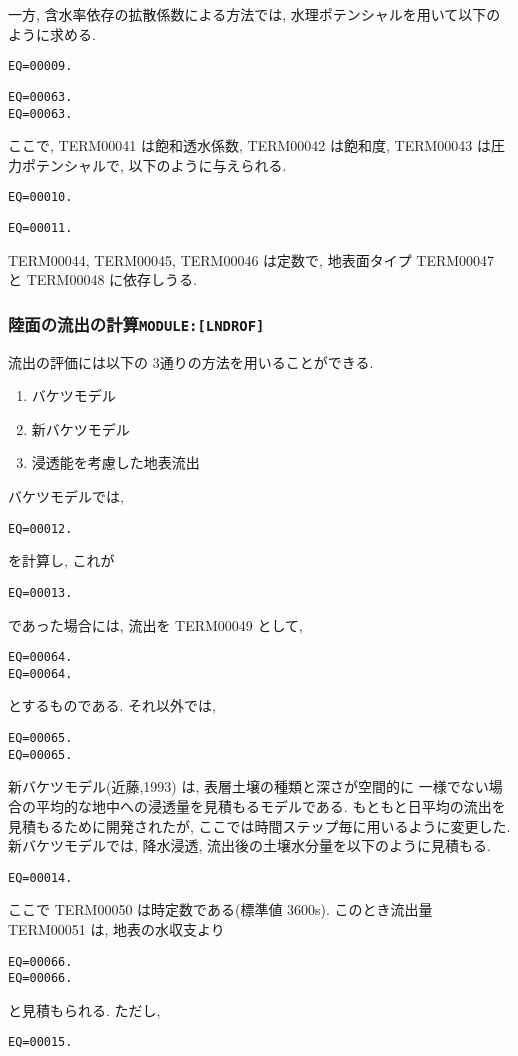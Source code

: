 一方, 含水率依存の拡散係数による方法では, 
水理ポテンシャルを用いて以下のように求める.
\begin{verbatim}
EQ=00009.
\end{verbatim}
\begin{verbatim}
EQ=00063.
EQ=00063.
\end{verbatim}
ここで, TERM00041 は飽和透水係数, TERM00042 は飽和度, TERM00043 は圧力ポテンシャルで, 
以下のように与えられる. 
\begin{verbatim}
EQ=00010.
\end{verbatim}
\begin{verbatim}
EQ=00011.
\end{verbatim}
TERM00044, TERM00045, TERM00046 は定数で, 地表面タイプ TERM00047 と TERM00048 に依存しうる. 

\subsubsection{陸面の流出の計算\texttt{MODULE:[LNDROF]}}

流出の評価には以下の 3通りの方法を用いることができる. 
\begin{enumerate}
\item バケツモデル
\item 新バケツモデル
\item 浸透能を考慮した地表流出
\end{enumerate}

バケツモデルでは,
\begin{verbatim}
EQ=00012.
\end{verbatim}
を計算し, これが
\begin{verbatim}
EQ=00013.
\end{verbatim}
であった場合には, 流出を TERM00049 として,
\begin{verbatim}
EQ=00064.
EQ=00064.
\end{verbatim}
とするものである.
それ以外では, 
\begin{verbatim}
EQ=00065.
EQ=00065.
\end{verbatim}

新バケツモデル(近藤,1993) は, 表層土壌の種類と深さが空間的に
一様でない場合の平均的な地中への浸透量を見積もるモデルである. 
もともと日平均の流出を見積もるために開発されたが, 
ここでは時間ステップ毎に用いるように変更した. 
%
新バケツモデルでは, 降水浸透, 流出後の土壌水分量を以下のように見積もる. 
\begin{verbatim}
EQ=00014.
\end{verbatim}
ここで TERM00050 は時定数である(標準値 3600s). 
%
このとき流出量 TERM00051 は, 地表の水収支より
\begin{verbatim}
EQ=00066.
EQ=00066.
\end{verbatim}
と見積もられる. 
ただし,
\begin{verbatim}
EQ=00015.
\end{verbatim}

